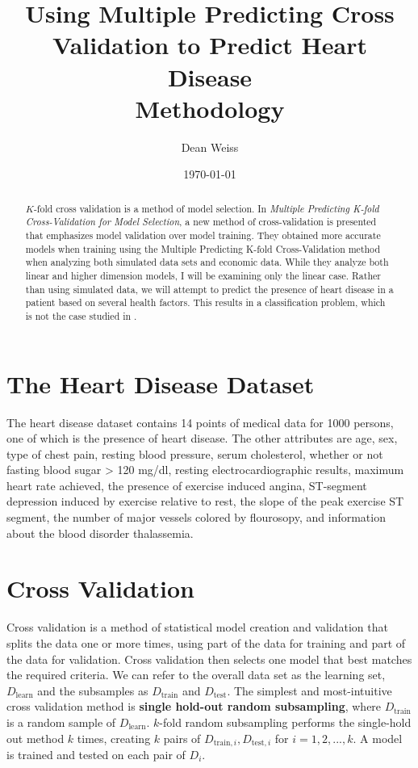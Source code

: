 \documentclass[letter]{article}
\title{Using Multiple Predicting Cross Validation to Predict Heart Disease\\
\large Methodology}
\author{Dean Weiss}
\date{\today}
\begin{document}
\maketitle
\begin{abstract}
\(K\)-fold cross validation is a method of model selection.  In \textit{Multiple Predicting K-fold Cross-Validation for Model Selection}, 
a new method of cross-validation is presented that emphasizes model validation over model training.  They obtained more accurate models when 
training using the Multiple Predicting K-fold Cross-Validation method when analyzing both simulated data sets and economic data.  While they 
analyze both linear and higher dimension models, I will be examining only the linear case.  Rather than using simulated data, we will attempt
to predict the presence of heart disease in a patient based on several health factors.  This results in a classification problem, which
is not the case studied in \citet{yoonsuhmulpred}.
\end{abstract}
\section{The Heart Disease Dataset}
The heart disease dataset \citep{heart_disease_dataset} contains 14 points of medical data for 1000 persons, one of which is the presence of heart disease.  The other attributes are age, sex, type of chest pain, resting blood pressure, serum cholesterol, whether or not fasting blood sugar > 120 mg/dl,
resting electrocardiographic results, maximum heart rate achieved, the presence of exercise induced angina, ST-segment depression induced by exercise
relative to rest, the slope of the peak exercise ST segment, the number of major vessels colored by flourosopy, and information about the blood disorder thalassemia.
\section{Cross Validation}

Cross validation is a method of statistical model creation and validation that splits the data one or more times, using part of the data for training and part of the data for validation.  Cross validation then selects one model that best matches the required criteria. \citep{Arlot_2010}  We can refer to the overall data set as the learning set, \(D_{\textrm{learn}}\) and the subsamples as \(D_{\textrm{train}}\) and \(D_{\textrm{test}}\).  The simplest and most-intuitive cross validation method is \textbf{single hold-out random subsampling}, where \(D_{\textrm{train}}\) is a random sample of \(D_{\textrm{learn}}\). \(k\)-fold random subsampling performs the single-hold out method \(k\) times, creating \(k\) pairs of \(D_{\textrm{train}, i}, D_{\textrm{test},i}\) for \(i=1,2,...,k\).  A model is trained and tested on each pair of \(D_i\).
\end{document}
